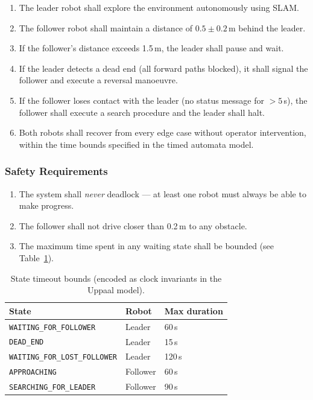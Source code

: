 \documentclass[11pt, a4paper]{article}
\begin{document}
\begin{enumerate}[label=\textbf{FR\arabic*.}]
  \item The leader robot shall explore the environment autonomously using SLAM.
  \item The follower robot shall maintain a distance of $0.5 \pm 0.2$\,m behind the leader.
  \item If the follower's distance exceeds 1.5\,m, the leader shall pause and wait.
  \item If the leader detects a dead end (all forward paths blocked), it shall signal
        the follower and execute a reversal manoeuvre.
  \item If the follower loses contact with the leader (no status message for $> 5$\,s),
        the follower shall execute a search procedure and the leader shall halt.
  \item Both robots shall recover from every edge case without operator intervention,
        within the time bounds specified in the timed automata model.
\end{enumerate}

\subsubsection{Safety Requirements}

\begin{enumerate}[label=\textbf{SR\arabic*.}]
  \item The system shall \emph{never} deadlock — at least one robot must always be
        able to make progress.
  \item The follower shall not drive closer than 0.2\,m to any obstacle.
  \item The maximum time spent in any waiting state shall be bounded (see Table~\ref{tab:timeouts}).
\end{enumerate}

\begin{table}[H]
\centering
\caption{State timeout bounds (encoded as clock invariants in the Uppaal model).}
\label{tab:timeouts}
\begin{tabular}{lll}
\toprule
\textbf{State} & \textbf{Robot} & \textbf{Max duration} \\
\midrule
\texttt{WAITING\_FOR\_FOLLOWER}     & Leader   & 60\,s  \\
\texttt{DEAD\_END}                  & Leader   & 15\,s  \\
\texttt{WAITING\_FOR\_LOST\_FOLLOWER} & Leader & 120\,s \\
\texttt{APPROACHING}                & Follower & 60\,s  \\
\texttt{SEARCHING\_FOR\_LEADER}     & Follower & 90\,s  \\
\bottomrule
\end{tabular}
\end{table}
\end{document}
